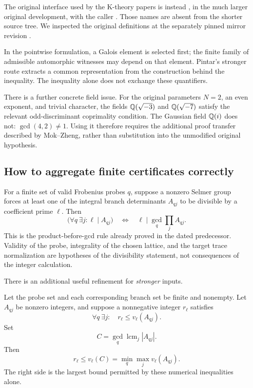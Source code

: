 The original interface used by the K-theory papers is instead
, in the much larger original
development, with the caller .
Those names are absent from the shorter source tree. We inspected
the original definitions at the separately pinned mirror revision
\cite{originalinterface}.

In the pointwise formulation, a Galois element is selected first;
the finite family of admissible automorphic witnesses may depend
on that element. Pintar's stronger route extracts a common
representation from the construction behind the inequality.
The inequality alone does not exchange these quantifiers.

There is a further concrete field issue. For the original parameters
$N=2$, an even exponent, and trivial character, the fields
$\mathbb Q(\sqrt{-3})$ and $\mathbb Q(\sqrt{-7})$ satisfy the relevant
odd-discriminant coprimality condition. The Gaussian field $\mathbb Q(i)$
does not: $\gcd(4,2)\ne1$. Using it therefore requires the additional
proof transfer described by Mok--Zheng, rather than substitution
into the unmodified original hypothesis.

\subsection{How to aggregate finite certificates correctly}

For a finite set of valid Frobenius probes $q$, suppose a nonzero
Selmer group forces at least one of the integral branch determinants
$A_{qj}$ to be divisible by a coefficient prime $\ell$.
Then
\[
 \bigl(\forall q\ \exists j:\ell\mid A_{qj}\bigr)
 \quad\Longleftrightarrow\quad
 \ell\mid\gcd_q\prod_j A_{qj}.
\]
This is the product-before-gcd rule already proved in the dated
predecessor. Validity of the probe, integrality of the chosen lattice,
and the target trace normalization are hypotheses of the
divisibility statement, not consequences of the integer calculation.

There is an additional useful refinement for \emph{stronger} inputs.

\begin{proposition}
\label{prop:lcm}
Let the probe set and each corresponding branch set be finite and
nonempty. Let $A_{qj}$ be nonzero integers, and suppose a nonnegative integer
$r_\ell$ satisfies
\[
 \forall q\ \exists j:\quad r_\ell\le v_\ell(A_{qj}).
\]
Set
\[
 C=\gcd_q\operatorname{lcm}_j|A_{qj}|.
\]
Then
\[
 r_\ell\le v_\ell(C)
       =\min_q\max_jv_\ell(A_{qj}).
\]
The right side is the largest bound permitted by these numerical
inequalities alone.
\end{proposition}

